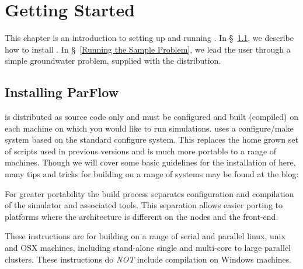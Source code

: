 
\chapter{Getting Started}
\label{Getting Started}

This chapter is an introduction to setting up and running \parflow{}.
In \S~\ref{Installing ParFlow}, we describe how to install \parflow{}.
In \S~\ref{Running the Sample Problem}, we lead the user through a
simple groundwater problem, supplied with the \parflow{} distribution.


\section{Installing ParFlow}
\label{Installing ParFlow}

\parflow{} is distributed as source code only and must be configured and built
(compiled) on each machine on which you would like to run simulations. 
\parflow{} uses a configure/make system based on the standard
 configure system.  This replaces the home grown
set of scripts used in previous versions and is much more portable to
a range of machines.  Though we will cover some basic guidelines for the installation
of \parflow{} here, many tips and tricks for building \parflow{} on a 
range of systems may be found at the \parflow{} blog: 

For greater portability the \parflow{} build process separates
configuration and compilation of the simulator and associated tools.
This separation allows easier porting to platforms where the
architecture is different on the nodes and the front-end.

These instructions are for building \parflow{} on a range of serial
and parallel linux, unix and OSX machines, including stand-alone
single and multi-core to large parallel clusters.  These instructions
do \emph{NOT} include compilation on Windows machines.


